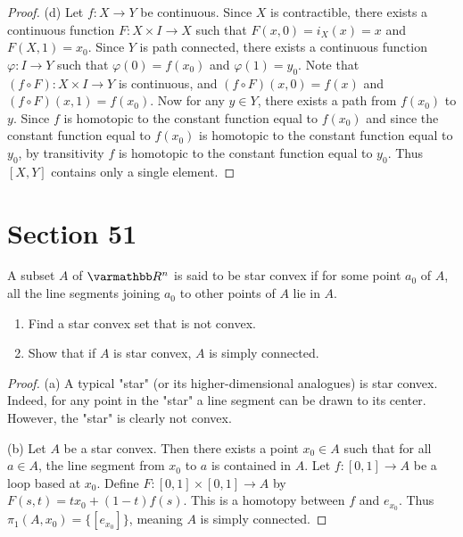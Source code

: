 \documentclass[10pt,oneside,openany]{memoir}
\begin{document}
\begin{proof}
        (d) Let $f:X \rightarrow Y$ be continuous. Since $X$ is contractible, there exists a continuous function $F:X \times I \rightarrow X$ such that $F(x,0) = i_X(x) = x$ and $F(X,1) = x_0$. Since $Y$ is path connected, there exists a continuous function $\varphi:I \rightarrow Y$ such that $\varphi(0) = f(x_0)$ and $\varphi(1) = y_0$. Note that $(f \circ F):X \times I \rightarrow Y$ is continuous, and $(f \circ F)(x,0) = f(x)$ and $(f \circ F)(x,1) = f(x_0)$. Now for any $y \in Y$, there exists a path from $f(x_0)$ to $y$. Since $f$ is homotopic to the constant function equal to $f(x_0)$ and since the constant function equal to $f(x_0)$ is homotopic to the constant function equal to $y_0$, by transitivity $f$ is homotopic to the constant function equal to $y_0$. Thus $[X,Y]$ contains only a single element.
    \end{proof}



\section*{Section 51}
\begin{exercise}
A subset $A$ of $\bfR^n$ is said to be star convex if for some point $a_0$ of $A$, all the line segments joining $a_0$ to other points of $A$ lie in $A$.
\begin{enumerate}[label = (\alph*),itemsep=1pt,topsep=3pt]
    \item Find a star convex set that is not convex.
    \item Show that if $A$ is star convex, $A$ is simply connected.
\end{enumerate}
\end{exercise}
    \begin{proof}
        (a) A typical "star" (or its higher-dimensional analogues) is star convex. Indeed, for any point in the "star" a line segment can be drawn to its center. However, the "star" is clearly not convex.

        (b) Let $A$ be a star convex. Then there exists a point $x_0 \in A$ such that for all $a \in A$, the line segment from $x_0$ to $a$ is contained in $A$. Let $f:[0,1] \rightarrow A$ be a loop based at $x_0$. Define $F:[0,1] \times [0,1] \rightarrow A$ by $F(s,t) = tx_0 + (1-t)f(s)$. This is a homotopy between $f$ and $e_{x_0}$. Thus $\pi_1(A,x_0) = \{[e_{x_0}]\}$, meaning $A$ is simply connected.
    \end{proof}
\end{document}
